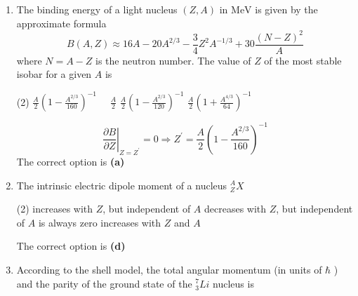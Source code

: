 \begin{enumerate}
{}\\
\begin{tasks}(2)
	\task[\textbf{A.}] E2 and E3
	\task[\textbf{B.}] M2 or E3
	\task[\textbf{C.}] E2 or M3
	\task[\textbf{D.}] M2 or M3
\end{tasks}
\begin{answer}
 No parity change; $\Delta J=2,3$\\
For $E_{l}$ type, $\Delta \pi=(-1)^{l}$, (for no parity change $l=2$ )\\
For $M_{l}$ type, $\Delta \pi=(-1)^{l+1}$, (for no parity change $l=3$ )\\
$\Delta J=2$, No parity change $\rightarrow E 2 ; \Delta J=3$, No parity change $\rightarrow M 3$\\
The correct option is \textbf{(c)}	
\end{answer}
\item The binding energy of a light nucleus $(Z, A)$ in $\mathrm{MeV}$ is given by the approximate formula
$$
B(A, Z) \approx 16 A-20 A^{2 / 3}-\frac{3}{4} Z^{2} A^{-1 / 3}+30 \frac{(N-Z)^{2}}{A}
$$
where $N=A-Z$ is the neutron number. The value of $Z$ of the most stable isobar for a given $A$ is
{}
\begin{tasks}(2)
	\task[\textbf{A.}] $\frac{A}{2}\left(1-\frac{A^{2 / 3}}{160}\right)^{-1} \quad$  
	\task[\textbf{B.}]$\frac{A}{2}$
	\task[\textbf{C.}]$\frac{A}{2}\left(1-\frac{A^{2 / 3}}{120}\right)^{-1}$
	\task[\textbf{D.}]$\frac{A}{2}\left(1+\frac{A^{4 / 3}}{64}\right)^{-1}$
\end{tasks}
\begin{answer}
	$$\left.\frac{\partial B}{\partial Z}\right|_{Z=Z^{\prime}}=0 \Rightarrow Z^{\prime}=\frac{A}{2}\left(1-\frac{A^{2 / 3}}{160}\right)^{-1}$$
	The correct option is \textbf{(a)}
\end{answer}
\item The intrinsic electric dipole moment of a nucleus ${ }_{Z}^{A} X$
{}
\begin{tasks}(2)
	\task[\textbf{A.}] increases with $Z$, but independent of $A$
	\task[\textbf{B.}]decreases with $Z$, but independent of $A$
	\task[\textbf{C.}]is always zero
	\task[\textbf{D.}]increases with $Z$ and $A$
\end{tasks}
\begin{answer}
	The correct option is \textbf{(d)}
\end{answer}
\item According to the shell model, the total angular momentum (in units of $\hbar$ ) and the parity of the ground state of the ${ }_{3}^{7} L i$ nucleus is

\end{enumerate}
